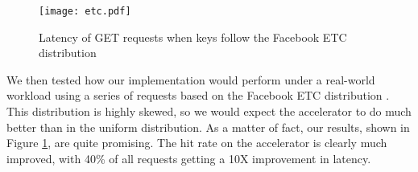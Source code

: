 \begin{figure}[t]
\begin{center}
\texttt{[image: etc.pdf]}
\caption{Latency of GET requests when keys follow the Facebook ETC distribution}
\label{fig:etc}
\end{center}
\end{figure}

We then tested how our implementation would perform under a real-world
workload using a series of requests based on the Facebook ETC
distribution \cite{AXFJP2012}. This distribution is highly skewed, so we would
expect the accelerator to do much better than in the uniform distribution.
As a matter of fact, our results, shown in Figure \ref{fig:etc}, are quite
promising. The hit rate on the accelerator is clearly much improved, with
40\% of all requests getting a 10X improvement in latency.
